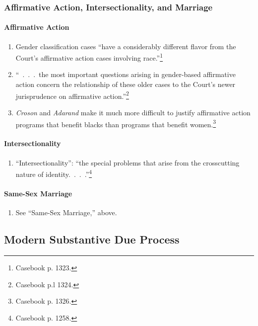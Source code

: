 \subsubsection{Affirmative Action, Intersectionality, and Marriage}

\paragraph{Affirmative Action}

\begin{enumerate}
    \item Gender classification cases ``have a considerably different flavor 
    from the Court's affirmative action cases involving 
    race.''\footnote{Casebook p. 1323.}
    \item ``~.~.~.~the most important questions arising in gender-based 
    affirmative action concern the relationship of these older cases to the 
    Court's newer jurisprudence on affirmative action.''\footnote{Casebook p.l 
    1324.}
    \item \emph{Croson} and \emph{Adarand} make it much more difficult to 
    justify affirmative action programs that benefit blacks than programs that 
    benefit women.\footnote{Casebook p. 1326.}
\end{enumerate}

\paragraph{Intersectionality}

\begin{enumerate}
    \item ``Intersectionality'': ``the special problems that arise from the 
    crosscutting nature of identity.~.~.~.''\footnote{Casebook p. 1258.}
\end{enumerate}

\paragraph{Same-Sex Marriage}

\begin{enumerate}
    \item See ``Same-Sex Marriage,'' above.
\end{enumerate}

\subsection{Modern Substantive Due Process}

